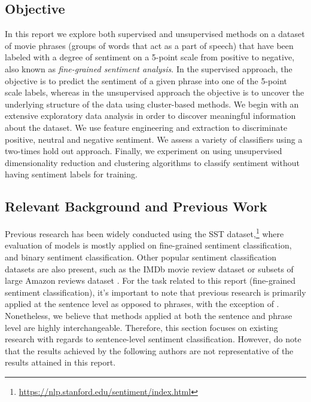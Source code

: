 \documentclass{article}
\begin{document}
\subsection{Objective}

In this report we explore both supervised and unsupervised methods on a dataset of movie phrases (groups of words that act as a part of speech) that have been labeled with a degree of sentiment on a 5-point scale from positive to negative, also known as \emph{fine-grained sentiment analysis}. In the supervised approach, the objective is to predict the sentiment of a given phrase into one of the 5-point scale labels, whereas in the unsupervised approach the objective is to uncover the underlying structure of the data using cluster-based methods. We begin with an extensive exploratory data analysis in order to discover meaningful information about the dataset. We use feature engineering and extraction to discriminate positive, neutral and negative sentiment. We assess a variety of classifiers using a two-times hold out approach. Finally, we experiment on using unsupervised dimensionality reduction and clustering algorithms to classify sentiment without having sentiment labels for training.

\subsection{Relevant Background and Previous Work}

Previous research has been widely conducted using the SST dataset,\footnote{\url{https://nlp.stanford.edu/sentiment/index.html}} where evaluation of models is mostly applied on fine-grained sentiment classification, and binary sentiment classification. Other popular sentiment classification datasets are also present, such as the IMDb movie review dataset \cite{maas-etal-2011-learning} or subsets of large Amazon reviews dataset \cite{he2016ups}. For the task related to this report (fine-grained sentiment classification), it's important to note that previous research is primarily applied at the sentence level as opposed to phrases, with the exception of \cite{yin-etal-2020-sentibert}. Nonetheless, we believe that methods applied at both the sentence and phrase level are highly interchangeable. Therefore, this section focuses on existing research with regards to sentence-level sentiment classification. However, do note that the results achieved by the following authors are not representative of the results attained in this report. 
\end{document}

